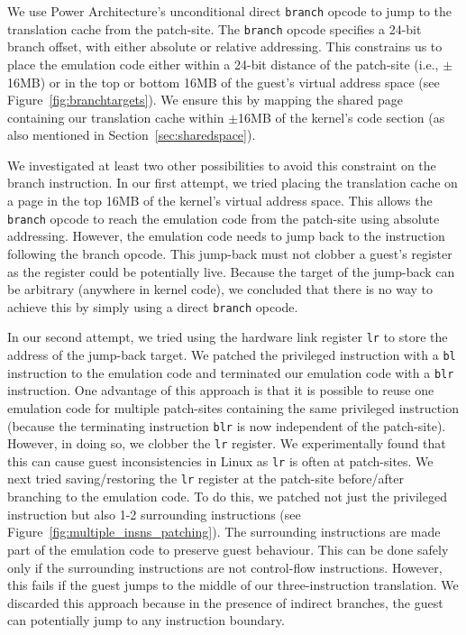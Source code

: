 \documentclass[10pt,twocolumn]{article}
\begin{document}
We use Power Architecture's unconditional direct {\tt branch} opcode to jump to the
translation cache from the patch-site. The {\tt branch} opcode specifies a 24-bit
branch offset, with either absolute or relative addressing. This constrains us
to place the emulation code either within a 24-bit distance of the patch-site (i.e.,
$\pm$16MB) or in the top or bottom 16MB of the guest's virtual address
space (see Figure~\ref{fig:branchtargets}). We ensure this by mapping the shared
page containing our translation cache within $\pm$16MB of the kernel's code
section (as also mentioned in Section~\ref{sec:sharedspace}).

We investigated at least two other possibilities to avoid this constraint
on the branch instruction. In our first attempt, we tried placing the
translation cache on a page in the top 16MB of the kernel's virtual address
space. This allows the {\tt branch} opcode to reach the emulation code from
the patch-site using absolute addressing. However, the emulation code needs to
jump back to the instruction following the branch opcode. This jump-back must not
clobber a guest's register as the register could be potentially live. Because
the target of the jump-back can be arbitrary (anywhere in kernel code), we concluded
that there is no way to achieve this by simply using a direct {\tt branch} opcode.

In our second attempt, we tried using the hardware link register {\tt lr} to store
the address
of the jump-back target. We patched the privileged instruction with a {\tt bl}
instruction to the emulation code and terminated our emulation code with a {\tt blr}
instruction. One advantage of this approach is that it is possible to
reuse one emulation code
for multiple patch-sites containing the same privileged instruction (because the
terminating instruction {\tt blr} is now independent of the patch-site). However, in
doing so, we
clobber the {\tt lr} register. We experimentally found that this can cause
guest inconsistencies in Linux as {\tt lr} is often at patch-sites.
We next tried saving/restoring the
{\tt lr} register at the patch-site before/after branching to the emulation code.
To do this, we patched not just the privileged instruction but also 1-2
surrounding instructions (see Figure~\ref{fig:multiple_insns_patching}). The
surrounding instructions are made part of the emulation code to preserve
guest behaviour. This can
be done safely only if the surrounding instructions are not control-flow instructions.
However, this fails if the guest jumps to the middle of our
three-instruction translation. We discarded this approach because in the presence
of indirect branches, the guest can potentially jump to any instruction boundary.
\end{document}
